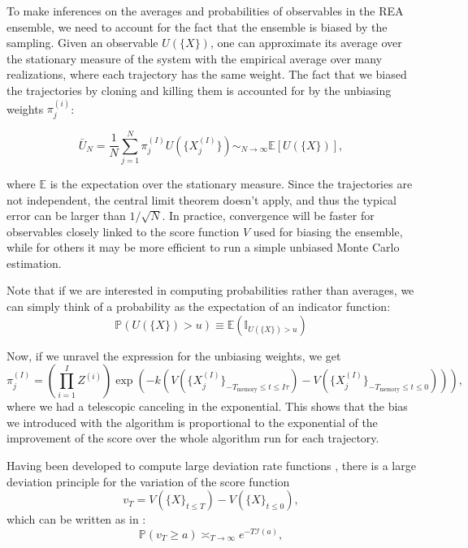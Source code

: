 To make inferences on the averages and probabilities of observables in the REA ensemble, we need to account for the fact that the ensemble is biased by the sampling.
Given an observable $U(\{X\})$, one can approximate its average over the stationary measure of the system with the empirical average over many realizations, where each trajectory has the same weight. The fact that we biased the trajectories by cloning and killing them is accounted for by the unbiasing weights $\pi_j^{(i)}$:

\begin{equation}\label{eq:veros:unbiased-averaging}
    \bar{U}_N = \frac{1}{N}\sum_{j=1}^N \pi_j^{(I)} U(\{X^{(I)}_j\}) \sim_{N \to \infty} \mathbb{E} \left[ U(\{X\}) \right],
\end{equation}

where $\mathbb{E}$ is the expectation over the stationary measure. Since the trajectories are not independent, the central limit theorem doesn't apply, and thus the typical error can be larger than $1/\sqrt{N}$.
In practice, convergence will be faster for observables closely linked to the score function $V$ used for biasing the ensemble, while for others it may be more efficient to run a simple unbiased Monte Carlo estimation.

Note that if we are interested in computing probabilities rather than averages, we can simply think of a probability as the expectation of an indicator function:
\begin{equation}
    \mathbb{P} \left(U(\{X\}) > u \right) \equiv \mathbb{E} \left( \mathbb{I}_{U(\{X\}) > u}  \right)
\end{equation}

Now, if we unravel the expression for the unbiasing weights, we get
\begin{equation}
    \pi_j^{(I)} = \left(\prod_{i=1}^{I}{Z^{(i)}} \right) \exp \left( -k \left(V(\{X_j^{(I)}\}_{-T_\text{memory} \leq t \leq I\tau}) - V(\{X_j^{(I)}\}_{-T_\text{memory} \leq t \leq 0})\right)  \right),
\end{equation}
where we had a telescopic canceling in the exponential.
This shows that the bias we introduced with the algorithm is proportional to the exponential of the improvement of the score over the whole algorithm run for each trajectory.

Having been developed to compute large deviation rate functions \cite{GIA06}, there is a large deviation principle for the variation of the score function
\begin{equation}\label{eq:veros:delta-score}
    v_T = V(\{X\}_{t \leq T}) - V(\{X\}_{t \leq 0}) ,
\end{equation}
which can be written as in \cite{RAG18}:
\begin{equation}\label{eq:veros:large-deviation-principle}
    \mathbb{P} \left( v_T \geq a \right) \asymp_{T \to \infty} e^{-T\mathcal{I}(a)},
\end{equation}

